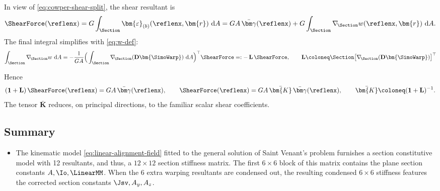 In view of \eqref{eq:cowper-shear-split}, the shear resultant is
\begin{equation}
\label{eq:F-balance}
\ShearForce(\reflenx)
=G\int_{\Section}\bm{\varepsilon}_{(b)}(\reflenx,\bm{r})\mathrm{~d}A
=GA\,\bar{\bm\gamma}(\reflenx)+G\int_{\Section}\nabla_{\!\Section}w(\reflenx,\bm{r})\mathrm{~d}A.
\end{equation}
The final integral simplifies with \eqref{eq:w-def}:
\begin{equation}
\int_{\Section}\nabla_{\!\Section}w\mathrm{~d}A
=-\frac{1}{GA}\Big(\int_{\Section}\nabla_{\!\Section}(\mathbf D\bm{\SimoWarp})\mathrm{~d}A\Big)^{\top}\ShearForce
=:-\,\mathbf L\,\ShearForce,
\qquad
\mathbf L\coloneq\Section\big[\nabla_{\!\Section}(\mathbf D\bm{\SimoWarp})\big]^{\top}
\label{eq:def-simo-L}
\end{equation}
\fi 

Hence
\begin{equation}
(\mathbf{1}+\mathbf L)\,\ShearForce(\reflenx)=GA\,\bar{\bm\gamma}(\reflenx),
\qquad
\ShearForce(\reflenx)=GA\,\bar{\bm{K}}\,\bar{\bm\gamma}(\reflenx),
\qquad
\bar{\bm{K}}\coloneq(\mathbf{1}+\mathbf L)^{-1}.
\label{eq:shear-force-from-avg-strain}
\end{equation}
The tensor $\bar{\bm{K}}$ reduces, on principal directions, to the familiar scalar shear coefficients.


\subsection{Summary}
\begin{itemize}
    \item The kinematic model \eqref{eq:linear-alignment-field} fitted to the general solution of Saint Venant's problem furnishes a section constitutive model with 12 resultants, and thus, a \(12\times12\) section stiffness matrix. 
    The first \(6\times6\) block of this matrix contains the plane section constants \(A,\Io, \LinearMM\). When the \(6\) extra warping resultants are condensed out, the resulting condensed \(6\times 6\) stiffness features the corrected section constants \(\Jsv,A_{y},A_{z}\).
\end{itemize}



